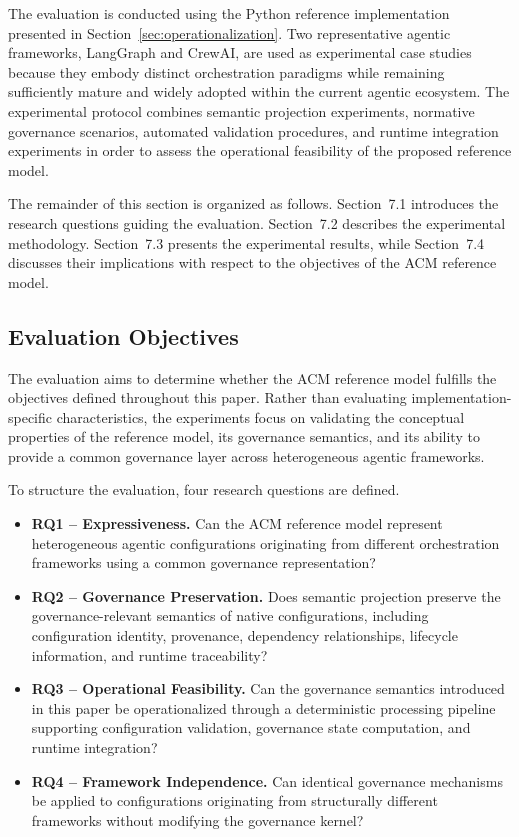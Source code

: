 \documentclass[10pt]{article}
\begin{document}
The evaluation is conducted using the Python reference implementation presented in Section~\ref{sec:operationalization}. Two representative agentic frameworks, LangGraph and CrewAI, are used as experimental case studies because they embody distinct orchestration paradigms while remaining sufficiently mature and widely adopted within the current agentic ecosystem. The experimental protocol combines semantic projection experiments, normative governance scenarios, automated validation procedures, and runtime integration experiments in order to assess the operational feasibility of the proposed reference model.

The remainder of this section is organized as follows. Section~7.1 introduces the research questions guiding the evaluation. Section~7.2 describes the experimental methodology. Section~7.3 presents the experimental results, while Section~7.4 discusses their implications with respect to the objectives of the ACM reference model.

\subsection{Evaluation Objectives}
\label{sec:evaluation_objectives}

The evaluation aims to determine whether the ACM reference model fulfills the objectives defined throughout this paper. Rather than evaluating implementation-specific characteristics, the experiments focus on validating the conceptual properties of the reference model, its governance semantics, and its ability to provide a common governance layer across heterogeneous agentic frameworks.

To structure the evaluation, four research questions are defined.

\begin{itemize}

\item \textbf{RQ1 -- Expressiveness.}
Can the ACM reference model represent heterogeneous agentic configurations originating from different orchestration frameworks using a common governance representation?

\item \textbf{RQ2 -- Governance Preservation.}
Does semantic projection preserve the governance-relevant semantics of native configurations, including configuration identity, provenance, dependency relationships, lifecycle information, and runtime traceability?

\item \textbf{RQ3 -- Operational Feasibility.}
Can the governance semantics introduced in this paper be operationalized through a deterministic processing pipeline supporting configuration validation, governance state computation, and runtime integration?

\item \textbf{RQ4 -- Framework Independence.}
Can identical governance mechanisms be applied to configurations originating from structurally different frameworks without modifying the governance kernel?

\end{itemize}
\end{document}
